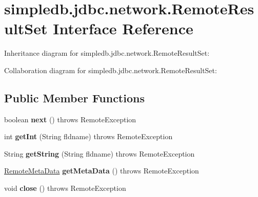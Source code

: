 \hypertarget{interfacesimpledb_1_1jdbc_1_1network_1_1RemoteResultSet}{}\section{simpledb.\+jdbc.\+network.\+Remote\+Result\+Set Interface Reference}
\label{interfacesimpledb_1_1jdbc_1_1network_1_1RemoteResultSet}


Inheritance diagram for simpledb.\+jdbc.\+network.\+Remote\+Result\+Set\+:


Collaboration diagram for simpledb.\+jdbc.\+network.\+Remote\+Result\+Set\+:
\subsection*{Public Member Functions}
\begin{DoxyCompactItemize}
\item 
\mbox{\label{interfacesimpledb_1_1jdbc_1_1network_1_1RemoteResultSet_a0fee7b3139f3b29b3281b563c0cce203}} 
boolean {\bfseries next} ()  throws Remote\+Exception
\item 
\mbox{\label{interfacesimpledb_1_1jdbc_1_1network_1_1RemoteResultSet_acf397822cdab28bfe994420bf26d68fc}} 
int {\bfseries get\+Int} (String fldname)  throws Remote\+Exception
\item 
\mbox{\label{interfacesimpledb_1_1jdbc_1_1network_1_1RemoteResultSet_a271da6a305af8d3769418f3a440afc02}} 
String {\bfseries get\+String} (String fldname)  throws Remote\+Exception
\item 
\mbox{\label{interfacesimpledb_1_1jdbc_1_1network_1_1RemoteResultSet_a574510d57fadc08e764b2070dc80fa24}} 
\hyperlink{interfacesimpledb_1_1jdbc_1_1network_1_1RemoteMetaData}{Remote\+Meta\+Data} {\bfseries get\+Meta\+Data} ()  throws Remote\+Exception
\item 
\mbox{\label{interfacesimpledb_1_1jdbc_1_1network_1_1RemoteResultSet_a0bfbf481b56a1dc2dce168b86aa04462}} 
void {\bfseries close} ()  throws Remote\+Exception
\end{DoxyCompactItemize}


